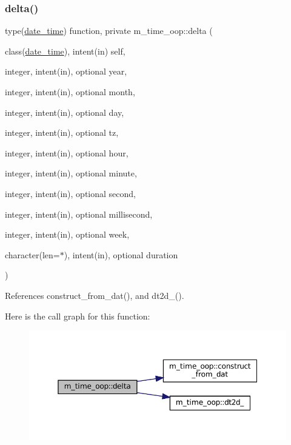 \subsubsection{\texorpdfstring{delta()}{delta()}}
{\footnotesize\ttfamily type(\mbox{\hyperlink{structm__time__oop_1_1date__time}{date\+\_\+time}}) function, private m\+\_\+time\+\_\+oop\+::delta (\begin{DoxyParamCaption}\item[{class(\mbox{\hyperlink{structm__time__oop_1_1date__time}{date\+\_\+time}}), intent(in)}]{self,  }\item[{integer, intent(in), optional}]{year,  }\item[{integer, intent(in), optional}]{month,  }\item[{integer, intent(in), optional}]{day,  }\item[{integer, intent(in), optional}]{tz,  }\item[{integer, intent(in), optional}]{hour,  }\item[{integer, intent(in), optional}]{minute,  }\item[{integer, intent(in), optional}]{second,  }\item[{integer, intent(in), optional}]{millisecond,  }\item[{integer, intent(in), optional}]{week,  }\item[{character(len=$\ast$), intent(in), optional}]{duration }\end{DoxyParamCaption})\hspace{0.3cm}{\ttfamily [private]}}



References construct\+\_\+from\+\_\+dat(), and dt2d\+\_\+().

Here is the call graph for this function\+:\nopagebreak
\begin{figure}[H]
\begin{center}
\leavevmode
\includegraphics[width=350pt]{namespacem__time__oop_aecd1edc1f6ca447d5381c8092eba7924_cgraph}
\end{center}
\end{figure}
\mbox{\label{namespacem__time__oop_a93bafde872994fe68136d83195400e11}} 

